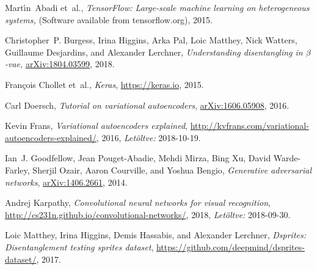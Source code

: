 \begin{thebibliography}{99}

Mart\'{\i}n~Abadi et~al., \textit{{TensorFlow}: Large-scale machine learning on heterogeneous systems,} (Software available from tensorflow.org),  2015.

Christopher~P. Burgess, Irina Higgins, Arka Pal, Loic Matthey, Nick Watters,
  Guillaume Desjardins, and Alexander Lerchner, 
\textit{Understanding disentangling in $\beta$-vae,}
\url{arXiv:1804.03599}, 2018.

Fran\c{c}ois Chollet et~al.,
\newblock \textit{Keras},
\newblock \url{https://keras.io}, 2015.

Carl Doersch,
\newblock \textit{Tutorial on variational autoencoders},
\newblock \url{arXiv:1606.05908}, 2016.



Kevin Frans,
\newblock \textit{Variational autoencoders explained},
\newblock \url{http://kvfrans.com/variational-autoencoders-explained/}, 2016,
\newblock \textsl{Let\"oltve:} 2018-10-19.

Ian~J. Goodfellow, Jean Pouget-Abadie, Mehdi Mirza, Bing Xu, David
  Warde-Farley, Sherjil Ozair, Aaron Courville, and Yoshua Bengio,
\newblock \textit{Generative adversarial networks},
\newblock \url{arXiv:1406.2661}, 2014.

Andrej Karpathy,
\newblock \textit{Convolutional neural networks for visual recognition},
\newblock \url{http://cs231n.github.io/convolutional-networks/}, 2018,
\newblock \textsl{Let\"oltve:} 2018-09-30.

Loic Matthey, Irina Higgins, Demis Hassabis, and Alexander Lerchner,
\newblock\textit{ Dsprites: Disentanglement testing sprites dataset},
\newblock \url{https://github.com/deepmind/dsprites-dataset/}, 2017.

\end{thebibliography}
